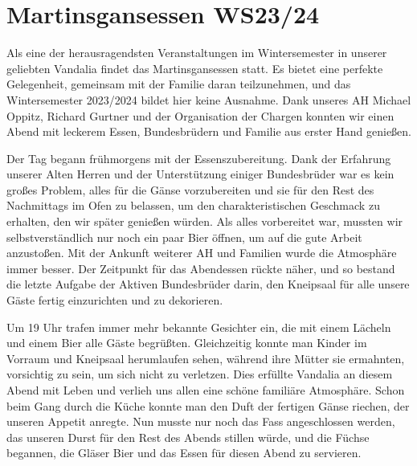 \section{Martinsgansessen WS23/24}



\begin{multicols}{2}
Als eine der herausragendsten Veranstaltungen im Wintersemester in unserer geliebten Vandalia findet das Martinsgansessen statt. Es bietet eine perfekte Gelegenheit, gemeinsam mit der Familie daran teilzunehmen, und das Wintersemester 2023/2024 bildet hier keine Ausnahme. Dank unseres AH Michael Oppitz, Richard Gurtner und der Organisation der Chargen konnten wir einen Abend mit leckerem Essen, Bundesbrüdern und Familie aus erster Hand genießen.

Der Tag begann frühmorgens mit der Essenszubereitung. Dank der Erfahrung unserer Alten Herren und der Unterstützung einiger Bundesbrüder war es kein großes Problem, alles für die Gänse vorzubereiten und sie für den Rest des Nachmittags im Ofen zu belassen, um den charakteristischen Geschmack zu erhalten, den wir später genießen würden. Als alles vorbereitet war, mussten wir selbstverständlich nur noch ein paar Bier öffnen, um auf die gute Arbeit anzustoßen. Mit der Ankunft weiterer AH und Familien wurde die Atmosphäre immer besser. Der Zeitpunkt für das Abendessen rückte näher, und so bestand die letzte Aufgabe der Aktiven Bundesbrüder darin, den Kneipsaal für alle unsere Gäste fertig einzurichten und zu dekorieren.

Um 19 Uhr trafen immer mehr bekannte Gesichter ein, die mit einem Lächeln und einem Bier alle Gäste begrüßten. Gleichzeitig konnte man Kinder im Vorraum und Kneipsaal herumlaufen sehen, während ihre Mütter sie ermahnten, vorsichtig zu sein, um sich nicht zu verletzen. Dies erfüllte Vandalia an diesem Abend mit Leben und verlieh uns allen eine schöne familiäre Atmosphäre. Schon beim Gang durch die Küche konnte man den Duft der fertigen Gänse riechen, der unseren Appetit anregte. Nun musste nur noch das Fass angeschlossen werden, das unseren Durst für den Rest des Abends stillen würde, und die Füchse begannen, die Gläser Bier und das Essen für diesen Abend zu servieren.


\end{multicols}

